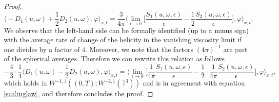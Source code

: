 \documentclass[10pt,a4paper]{amsart}
\begin{document}
\begin{proof}
\begin{equation*}
\bigg\langle - D_{1} (u, \omega) + \frac{1}{2} D_{2} (u, \omega) ,  \varphi \bigg\rangle_{x,t} = \frac{3}{4 \pi} \bigg\langle \lim_{\epsilon \rightarrow 0} \bigg[ \frac{S_1 (u,\omega,\epsilon)}{\epsilon} - \frac{1}{2} \frac{S_2 (u,\omega,\epsilon)}{\epsilon} \bigg] , \varphi \bigg\rangle_{x,t}.
\end{equation*}
We observe that the left-hand side can be formally identified (up to a minus sign) with the average rate of change of the helicity in the vanishing viscosity limit if one divides by a factor of $4$. Moreover, we note that the factors $(4 \pi)^{-1}$ are part of the spherical averages. Therefore we can rewrite this relation as follows
\begin{equation}
-\frac{4}{3} \cdot \frac{1}{4} \bigg\langle D_1 (u, \omega) - \frac{1}{2} D_2 (u, \omega), \varphi \bigg\rangle_{x,t} = \bigg\langle \lim_{\epsilon \rightarrow 0} \bigg[ \frac{1}{4 \pi} \frac{S_1 (u,\omega,\epsilon)}{\epsilon} - \frac{1}{2} \cdot \frac{1}{4 \pi} \frac{S_2 (u,\omega,\epsilon)}{\epsilon} \bigg] , \varphi \bigg\rangle_{x,t},
\end{equation}
which holds in $W^{-1,1} ((0,T); W^{-2,1} (\mathbb{T}^3))$ and is in agreement with equation \eqref{scalinglaw}, and therefore concludes the proof.
\end{proof}
\end{document}
